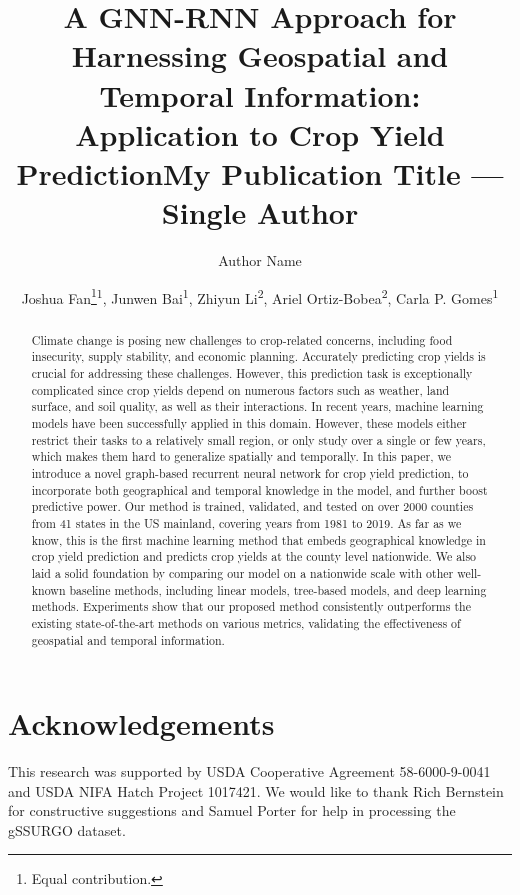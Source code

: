 \documentclass[letterpaper]{article}
\title{A GNN-RNN Approach for Harnessing Geospatial and Temporal Information:\\  Application to  Crop Yield Prediction}
\title{My Publication Title --- Single Author}
\author {
    Author Name
}
\author{
    Joshua Fan\thanks{Equal contribution.}\textsuperscript{\rm 1}, Junwen Bai\footnotemark[1]\textsuperscript{\rm 1},  Zhiyun Li\footnotemark[1]\textsuperscript{\rm 2},  Ariel Ortiz-Bobea\textsuperscript{\rm 2}, Carla P. Gomes\textsuperscript{\rm 1}\\
}
\begin{document}
\maketitle

\begin{abstract}
Climate change is posing new challenges to crop-related concerns, including food insecurity, supply stability, and economic planning. Accurately predicting crop yields is crucial for addressing these challenges. However, this prediction task is exceptionally complicated since crop yields depend on numerous factors such as weather, land surface, and soil quality, as well as their interactions. In recent years, machine learning models have been successfully applied in this domain. However, these models either restrict their tasks to a relatively small region, or only study over a single or few years, which makes them hard to generalize spatially and temporally. In this paper, we introduce a novel graph-based recurrent neural network for crop yield prediction, to incorporate both geographical and temporal knowledge in the model, and further boost predictive power. Our method is trained, validated, and tested on over 2000 counties from 41 states in the US mainland, covering years from 1981 to 2019. As far as we know, this is the first machine learning method that embeds geographical knowledge in crop yield prediction and predicts crop yields at the county level nationwide. We also laid a solid foundation by comparing our model on a nationwide scale with other well-known baseline methods, including linear models, tree-based models, and deep learning methods. Experiments show that our proposed method consistently outperforms the existing state-of-the-art methods on various metrics, validating the effectiveness of geospatial and temporal information.

\end{abstract}












\section{Acknowledgements}

This research was supported by USDA Cooperative Agreement 58-6000-9-0041 and USDA NIFA Hatch Project 1017421. We would like to thank Rich Bernstein for constructive suggestions and Samuel Porter for help in processing the gSSURGO dataset.
\end{document}
